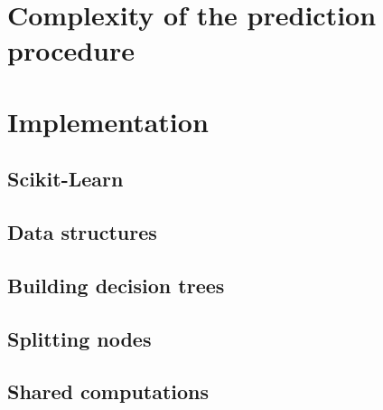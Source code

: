\section{Complexity of the prediction procedure}
\label{sec:5:complexity-predict}


\section{Implementation}
\label{sec:5:impl}

\subsection{Scikit-Learn}


\subsection{Data structures}


\subsection{Building decision trees}


\subsection{Splitting nodes}


\subsection{Shared computations}




